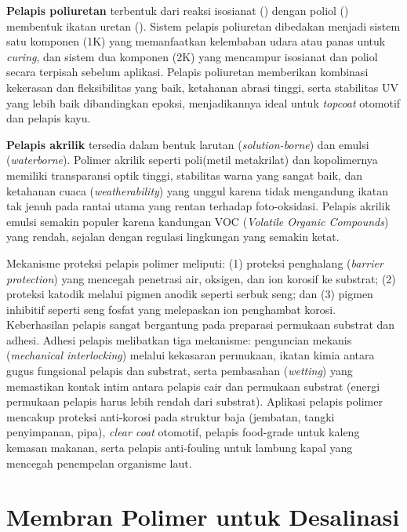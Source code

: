 \documentclass[12pt,a4paper,openany]{book}
\begin{document}
\textbf{Pelapis poliuretan} terbentuk dari reaksi isosianat () dengan poliol () membentuk ikatan uretan (). Sistem pelapis poliuretan dibedakan menjadi sistem satu komponen (1K) yang memanfaatkan kelembaban udara atau panas untuk \textit{curing}, dan sistem dua komponen (2K) yang mencampur isosianat dan poliol secara terpisah sebelum aplikasi. Pelapis poliuretan memberikan kombinasi kekerasan dan fleksibilitas yang baik, ketahanan abrasi tinggi, serta stabilitas UV yang lebih baik dibandingkan epoksi, menjadikannya ideal untuk \textit{topcoat} otomotif dan pelapis kayu.

\textbf{Pelapis akrilik} tersedia dalam bentuk larutan (\textit{solution-borne}) dan emulsi (\textit{waterborne}). Polimer akrilik seperti poli(metil metakrilat) dan kopolimernya memiliki transparansi optik tinggi, stabilitas warna yang sangat baik, dan ketahanan cuaca (\textit{weatherability}) yang unggul karena tidak mengandung ikatan tak jenuh pada rantai utama yang rentan terhadap foto-oksidasi. Pelapis akrilik emulsi semakin populer karena kandungan VOC (\textit{Volatile Organic Compounds}) yang rendah, sejalan dengan regulasi lingkungan yang semakin ketat.

Mekanisme proteksi pelapis polimer meliputi: (1) proteksi penghalang (\textit{barrier protection}) yang mencegah penetrasi air, oksigen, dan ion korosif ke substrat; (2) proteksi katodik melalui pigmen anodik seperti serbuk seng; dan (3) pigmen inhibitif seperti seng fosfat yang melepaskan ion penghambat korosi. Keberhasilan pelapis sangat bergantung pada preparasi permukaan substrat dan adhesi. Adhesi pelapis melibatkan tiga mekanisme: penguncian mekanis (\textit{mechanical interlocking}) melalui kekasaran permukaan, ikatan kimia antara gugus fungsional pelapis dan substrat, serta pembasahan (\textit{wetting}) yang memastikan kontak intim antara pelapis cair dan permukaan substrat (energi permukaan pelapis harus lebih rendah dari substrat). Aplikasi pelapis polimer mencakup proteksi anti-korosi pada struktur baja (jembatan, tangki penyimpanan, pipa), \textit{clear coat} otomotif, pelapis food-grade untuk kaleng kemasan makanan, serta pelapis anti-fouling untuk lambung kapal yang mencegah penempelan organisme laut.

\section{Membran Polimer untuk Desalinasi}
\end{document}
